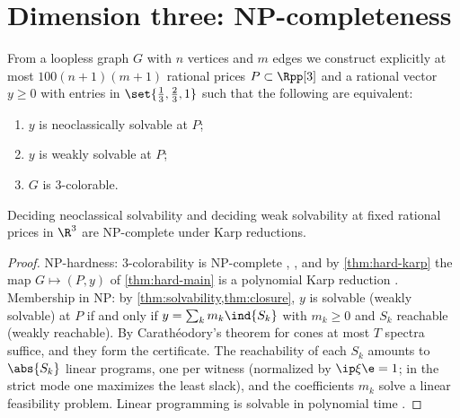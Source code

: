 \section{Dimension three: NP-completeness}\label{sec:hardness}

\begin{theorem}[main]\label{thm:hard-main}
From a loopless graph $G$ with $n$ vertices and $m$ edges we construct explicitly at most $100(n+1)(m+1)$ rational prices $P\subset\Rpp[3]$ and a rational vector $y\ge0$ with entries in $\set{\frac13,\frac23,1}$ such that the following are equivalent:
\begin{enumerate}[label=(\roman*)]
\item $y$ is neoclassically solvable at $P$;
\item $y$ is weakly solvable at $P$;
\item $G$ is 3-colorable.
\end{enumerate}
\end{theorem}

\begin{corollary}\label{cor:hard-np}
Deciding neoclassical solvability and deciding weak solvability at fixed rational prices in $\R^3$ are NP-complete under Karp reductions.
\end{corollary}

\begin{proof}
NP-hardness: 3-colorability is NP-complete \citep{GareyJohnsonStockmeyer1976}, \citep[Problem GT4]{GareyJohnson1979}, and by \cref{thm:hard-karp} the map $G\mapsto(P,y)$ of \cref{thm:hard-main} is a polynomial Karp reduction \citep[\S2.4]{GareyJohnson1979}. Membership in NP: by \cref{thm:solvability,thm:closure}, $y$ is solvable (weakly solvable) at $P$ if and only if $y=\sum_km_k\ind{S_k}$ with $m_k\ge0$ and $S_k$ reachable (weakly reachable). By Carath\'eodory's theorem for cones \citep[Cor.~17.1.2]{Rockafellar1970} at most $T$ spectra suffice, and they form the certificate. The reachability of each $S_k$ amounts to $\abs{S_k}$ linear programs, one per witness (normalized by $\ip\xi\e=1$; in the strict mode one maximizes the least slack), and the coefficients $m_k$ solve a linear feasibility problem. Linear programming is solvable in polynomial time \citep[Ch.~13]{Schrijver1986}.
\end{proof}


